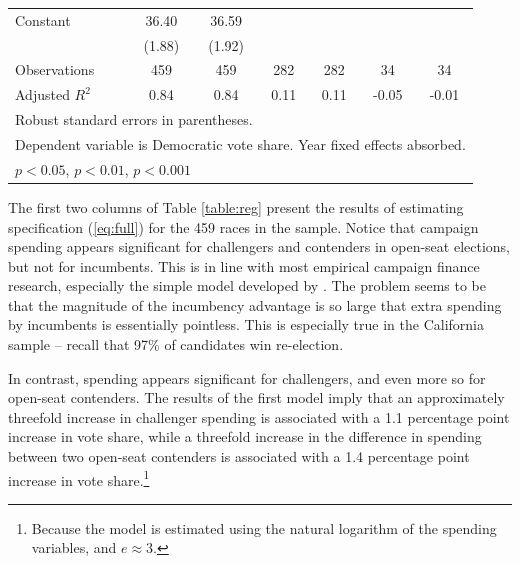 \documentclass{article}
\begin{document}
\begin{table}
\begin{tabular}{l*{6}{c}}
\addlinespace
Constant            &       36.40\sym{***}&       36.59\sym{***}&                     &                     &                     &                     \\
                    &      (1.88)         &      (1.92)         &                     &                     &                     &                     \\
\midrule
Observations        &         459         &         459         &         282         &         282         &          34         &          34         \\
Adjusted \(R^{2}\)  &        0.84         &        0.84         &        0.11         &        0.11         &       -0.05         &       -0.01         \\
\bottomrule
\multicolumn{7}{l}{\footnotesize Robust standard errors in parentheses.}\\
\multicolumn{7}{l}{\footnotesize Dependent variable is Democratic vote share. Year fixed effects absorbed.}\\
\multicolumn{7}{l}{\footnotesize \sym{*} \(p<0.05\), \sym{**} \(p<0.01\), \sym{***} \(p<0.001\)}\\
\end{tabular}
\end{table}

The first two columns of Table \ref{table:reg} present the results of estimating specification (\ref{eq:full}) for the 459 races in the sample. Notice that campaign spending appears significant for challengers and contenders in open-seat elections, but not for incumbents. This is in line with most empirical campaign finance research, especially the simple model developed by \cite{jacobson-1978}. The problem seems to be that the magnitude of the incumbency advantage is so large that extra spending by incumbents is essentially pointless. This is especially true in the California sample -- recall that 97\% of candidates win re-election.

In contrast, spending appears significant for challengers, and even more so for open-seat contenders. The results of the first model imply that an approximately threefold increase in challenger spending is associated with a 1.1 percentage point increase in vote share, while a threefold increase in the difference in spending between two open-seat contenders is associated with a 1.4 percentage point increase in vote share.\footnote{Because the model is estimated using the natural logarithm of the spending variables, and $e \approx 3$.}
\end{document}
